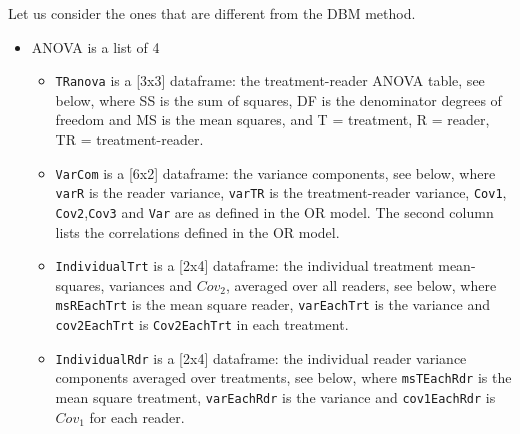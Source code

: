 \documentclass[
]{book}
\providecommand{\tightlist}{%
  \setlength{\itemsep}{0pt}\setlength{\parskip}{0pt}}
\begin{document}
Let us consider the ones that are different from the DBM method.

\begin{itemize}
\tightlist
\item
  ANOVA is a list of 4

  \begin{itemize}
  \tightlist
  \item
    \texttt{TRanova} is a {[}3x3{]} dataframe: the treatment-reader ANOVA table, see below, where SS is the sum of squares, DF is the denominator degrees of freedom and MS is the mean squares, and T = treatment, R = reader, TR = treatment-reader.\\
  \item
    \texttt{VarCom} is a {[}6x2{]} dataframe: the variance components, see below, where \texttt{varR} is the reader variance, \texttt{varTR} is the treatment-reader variance, \texttt{Cov1}, \texttt{Cov2},\texttt{Cov3} and \texttt{Var} are as defined in the OR model. The second column lists the correlations defined in the OR model.
  \item
    \texttt{IndividualTrt} is a {[}2x4{]} dataframe: the individual treatment mean-squares, variances and \(Cov_2\), averaged over all readers, see below, where \texttt{msREachTrt} is the mean square reader, \texttt{varEachTrt} is the variance and \texttt{cov2EachTrt} is \texttt{Cov2EachTrt} in each treatment.
  \item
    \texttt{IndividualRdr} is a {[}2x4{]} dataframe: the individual reader variance components averaged over treatments, see below, where \texttt{msTEachRdr} is the mean square treatment, \texttt{varEachRdr} is the variance and \texttt{cov1EachRdr} is \(Cov_1\) for each reader.
  \end{itemize}
\end{itemize}
\end{document}
